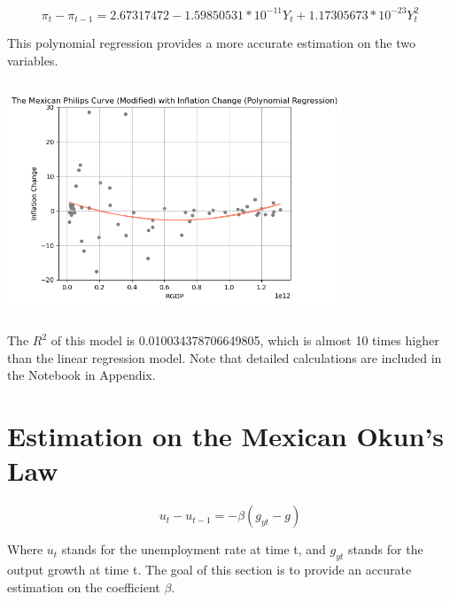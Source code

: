 \documentclass{article}
\begin{document}
    \begin{equation}
        \pi_t - \pi_{t-1} = 2.67317472 - 1.59850531*10^{-11}Y_t + 1.17305673 * 10^{-23}Y_t^{2}
    \end{equation}

    {This polynomial regression provides a more accurate estimation on the two variables.}

    \begin{center}
        \includegraphics[width=10cm, height=7cm]{Philips Curve Polynominal.png}
    \end{center}

    {The $R^2$ of this model is 0.010034378706649805, which is almost 10 times higher than the linear regression model. Note that detailed calculations are included in the Notebook in Appendix.}

\section{Estimation on the Mexican Okun's Law}

    \hspace{5mm}{Okun's Law is an macroeconomic concept that shows the (mostly negative) relation between the change in unemployment rate and the Real GDP growth. The mathematical relation is provided as below,}
    
    \begin{equation}
         u_t - u_{t-1} = - \beta (g_{yt} - g)
    \end{equation}

    {Where $u_t$ stands for the unemployment rate at time t, and $g_{yt}$ stands for the output growth at time t. The goal of this section is to provide an accurate estimation on the coefficient $\beta$.}

    \vspace{5mm}
    
\end{document}
